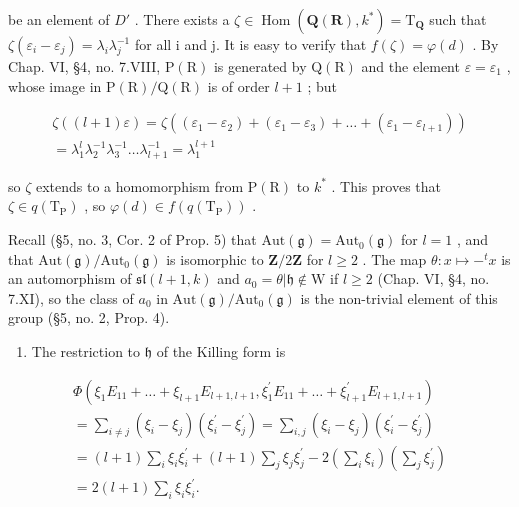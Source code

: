 be an element of \(D'\) . There exists a \(\zeta \in \operatorname{Hom}(\mathbf{Q}(\mathbf{R}), k^{*}) = \mathrm{T}_{\mathbf{Q}}\) such that \(\zeta(\varepsilon_{i} - \varepsilon_{j}) = \lambda_{i}\lambda_{j}^{-1}\) for all i and j. It is easy to verify that \(f(\zeta) = \varphi(d)\) . By Chap. VI, §4, no. 7.VIII, \(\mathrm{P}(\mathrm{R})\) is generated by \(\mathrm{Q}(\mathrm{R})\) and the element \(\varepsilon = \varepsilon_{1}\) , whose image in \(\mathrm{P}(\mathrm{R})/\mathrm{Q}(\mathrm{R})\) is of order \(l + 1\) ; but

\[
\begin{array}{c} \zeta ((l + 1) \varepsilon) = \zeta ((\varepsilon_ {1} - \varepsilon_ {2}) + (\varepsilon_ {1} - \varepsilon_ {3}) + \dots + (\varepsilon_ {1} - \varepsilon_ {l + 1})) \\ = \lambda_ {1} ^ {l} \lambda_ {2} ^ {- 1} \lambda_ {3} ^ {- 1} \ldots \lambda_ {l + 1} ^ {- 1} = \lambda_ {1} ^ {l + 1} \end{array}
\]

so \(\zeta\) extends to a homomorphism from \(\mathrm{P}(\mathrm{R})\) to \(k^{*}\) . This proves that \(\zeta \in q(\mathrm{T}_{\mathrm{P}})\) , so \(\varphi(d) \in f(q(\mathrm{T}_{\mathrm{P}}))\) .

Recall (§5, no. 3, Cor. 2 of Prop. 5) that \(\mathrm{Aut}(\mathfrak{g}) = \mathrm{Aut}_0(\mathfrak{g})\) for \(l = 1\) , and that \(\mathrm{Aut}(\mathfrak{g}) / \mathrm{Aut}_0(\mathfrak{g})\) is isomorphic to \(\mathbf{Z}/2\mathbf{Z}\) for \(l \geq 2\) . The map \(\theta : x \mapsto -^t x\) is an automorphism of \(\mathfrak{sl}(l + 1, k)\) and \(a_0 = \theta|\mathfrak{h} \notin \mathrm{W}\) if \(l \geq 2\) (Chap. VI, §4, no. 7.XI), so the class of \(a_0\) in \(\mathrm{Aut}(\mathfrak{g}) / \mathrm{Aut}_0(\mathfrak{g})\) is the non-trivial element of this group (§5, no. 2, Prop. 4).

\begin{enumerate}
\def\labelenumi{(\Roman{enumi})}
\setcounter{enumi}{7}
\tightlist
\item
  The restriction to \(\mathfrak{h}\) of the Killing form is
\end{enumerate}

\[
\begin{array}{l} \Phi (\xi_ {1} E _ {1 1} + \dots + \xi_ {l + 1} E _ {l + 1, l + 1}, \xi_ {1} ^ {\prime} E _ {1 1} + \dots + \xi_ {l + 1} ^ {\prime} E _ {l + 1, l + 1}) \\ = \sum_ {i \neq j} (\xi_ {i} - \xi_ {j}) (\xi_ {i} ^ {\prime} - \xi_ {j} ^ {\prime}) = \sum_ {i, j} (\xi_ {i} - \xi_ {j}) (\xi_ {i} ^ {\prime} - \xi_ {j} ^ {\prime}) \\ = (l + 1) \sum_ {i} \xi_ {i} \xi_ {i} ^ {\prime} + (l + 1) \sum_ {j} \xi_ {j} \xi_ {j} ^ {\prime} - 2 \left(\sum_ {i} \xi_ {i}\right) \left(\sum_ {j} \xi_ {j} ^ {\prime}\right) \\ = 2 (l + 1) \sum_ {i} \xi_ {i} \xi_ {i} ^ {\prime}. \end{array}
\]

